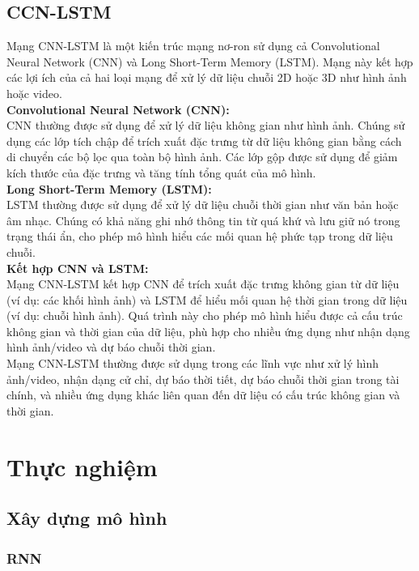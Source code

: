 \documentclass[conference]{IEEEtran}
\begin{document}
\subsection{CCN-LSTM}
Mạng CNN-LSTM là một kiến trúc mạng nơ-ron sử dụng cả Convolutional Neural Network (CNN) và Long Short-Term Memory (LSTM). Mạng này kết hợp các lợi ích của cả hai loại mạng để xử lý dữ liệu chuỗi 2D hoặc 3D như hình ảnh hoặc video.\\
\textbf{Convolutional Neural Network (CNN):}\\
CNN thường được sử dụng để xử lý dữ liệu không gian như hình ảnh. Chúng sử dụng các lớp tích chập để trích xuất đặc trưng từ dữ liệu không gian bằng cách di chuyển các bộ lọc qua toàn bộ hình ảnh. Các lớp gộp được sử dụng để giảm kích thước của đặc trưng và tăng tính tổng quát của mô hình.\\
\textbf{Long Short-Term Memory (LSTM):}\\
LSTM thường được sử dụng để xử lý dữ liệu chuỗi thời gian như văn bản hoặc âm nhạc. Chúng có khả năng ghi nhớ thông tin từ quá khứ và lưu giữ nó trong trạng thái ẩn, cho phép mô hình hiểu các mối quan hệ phức tạp trong dữ liệu chuỗi.\\
\textbf{Kết hợp CNN và LSTM:}\\
Mạng CNN-LSTM kết hợp CNN để trích xuất đặc trưng không gian từ dữ liệu (ví dụ: các khối hình ảnh) và LSTM để hiểu mối quan hệ thời gian trong dữ liệu (ví dụ: chuỗi hình ảnh). Quá trình này cho phép mô hình hiểu được cả cấu trúc không gian và thời gian của dữ liệu, phù hợp cho nhiều ứng dụng như nhận dạng hình ảnh/video và dự báo chuỗi thời gian.\\
Mạng CNN-LSTM thường được sử dụng trong các lĩnh vực như xử lý hình ảnh/video, nhận dạng cử chỉ, dự báo thời tiết, dự báo chuỗi thời gian trong tài chính, và nhiều ứng dụng khác liên quan đến dữ liệu có cấu trúc không gian và thời gian.

\section{Thực nghiệm}

\subsection{Xây dựng mô hình}

\subsubsection{RNN}
\end{document}
